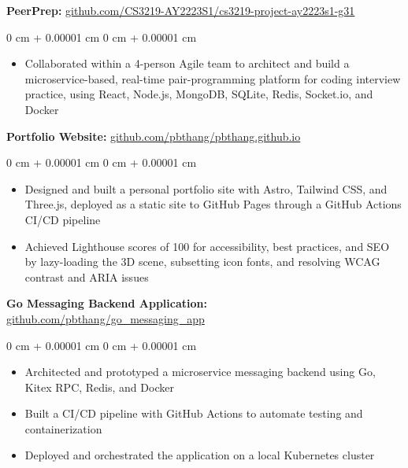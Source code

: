 \documentclass[10pt, letterpaper]{article}
\newenvironment{highlights}{
    \begin{itemize}[
        topsep=0.05 cm,
        parsep=0.05 cm,
        partopsep=0pt,
        itemsep=0pt,
        leftmargin=0 cm + 10pt
    ]
}{
    \end{itemize}
} %
\newenvironment{onecolentry}{
    \begin{adjustwidth}{
        0 cm + 0.00001 cm
    }{
        0 cm + 0.00001 cm
    }
}{
    \end{adjustwidth}
} %
\begin{document}
        
        \textbf{PeerPrep:}
        \href{https://github.com/CS3219-AY2223S1/cs3219-project-ay2223s1-g31}{github.com/CS3219-AY2223S1/cs3219-project-ay2223s1-g31}

        \vspace{0.06 cm}
        \begin{onecolentry}
            \begin{highlights}
                \item Collaborated within a 4-person Agile team to architect and build a microservice-based, real-time pair-programming platform for coding interview practice, using React, Node.js, MongoDB, SQLite, Redis, Socket.io, and Docker
            \end{highlights}
        \end{onecolentry}


        \vspace{0.12 cm}

        \textbf{Portfolio Website:}
        \href{https://github.com/pbthang/pbthang.github.io}{github.com/pbthang/pbthang.github.io}

        \vspace{0.06 cm}
        \begin{onecolentry}
            \begin{highlights}
                \item Designed and built a personal portfolio site with Astro, Tailwind CSS, and Three.js, deployed as a static site to GitHub Pages through a GitHub Actions CI/CD pipeline
                \item Achieved Lighthouse scores of 100 for accessibility, best practices, and SEO by lazy-loading the 3D scene, subsetting icon fonts, and resolving WCAG contrast and ARIA issues
            \end{highlights}
        \end{onecolentry}


        \vspace{0.12 cm}

        \textbf{Go Messaging Backend Application:}
        \href{https://github.com/pbthang/go_messaging_app}{github.com/pbthang/go\_messaging\_app}

        \vspace{0.06 cm}
        \begin{onecolentry}
            \begin{highlights}
                \item Architected and prototyped a microservice messaging backend using Go, Kitex RPC, Redis, and Docker
                \item Built a CI/CD pipeline with GitHub Actions to automate testing and containerization
                \item Deployed and orchestrated the application on a local Kubernetes cluster
            \end{highlights}
        \end{onecolentry}
\end{document}
